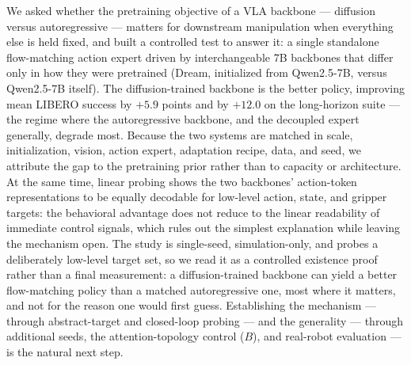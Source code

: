 \documentclass{article}
\begin{document}
We asked whether the pretraining objective of a VLA backbone --- diffusion versus
autoregressive --- matters for downstream manipulation when everything else is
held fixed, and built a controlled test to answer it: a single standalone
flow-matching action expert driven by interchangeable 7B backbones that differ
only in how they were pretrained (Dream, initialized from Qwen2.5-7B, versus
Qwen2.5-7B itself). The diffusion-trained backbone is the better policy, improving
mean LIBERO success by $+5.9$ points and by $+12.0$ on the long-horizon suite ---
the regime where the autoregressive backbone, and the decoupled expert generally,
degrade most. Because the two systems are matched in scale, initialization,
vision, action expert, adaptation recipe, data, and seed, we attribute the gap to
the pretraining prior rather than to capacity or architecture. At the same time,
linear probing shows the two backbones' action-token representations to be equally
decodable for low-level action, state, and gripper targets: the behavioral
advantage does not reduce to the linear readability of immediate control signals,
which rules out the simplest explanation while leaving the mechanism open.
The study is single-seed, simulation-only, and probes a deliberately low-level
target set, so we read it as a controlled existence proof rather than a final
measurement: a diffusion-trained backbone can yield a better flow-matching policy
than a matched autoregressive one, most where it matters, and not for the reason
one would first guess. Establishing the mechanism --- through abstract-target and
closed-loop probing --- and the generality --- through additional seeds, the
attention-topology control ($B$), and real-robot evaluation --- is the natural
next step.
\end{document}
